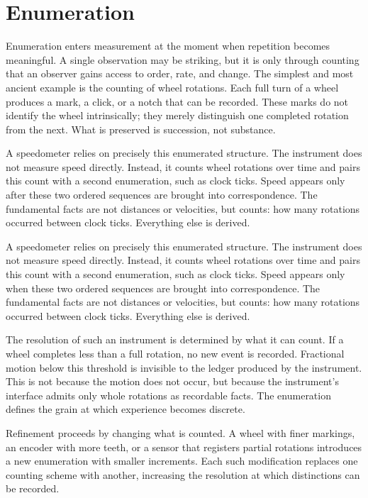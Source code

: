 \section{Enumeration}
\label{sec:enumeration}

Enumeration enters measurement at the moment when repetition becomes
meaningful. A single observation may be striking, but it is only through
counting that an observer gains access to order, rate, and change. The simplest
and most ancient example is the counting of wheel rotations. Each full turn of
a wheel produces a mark, a click, or a notch that can be recorded. These marks
do not identify the wheel intrinsically; they merely distinguish one completed
rotation from the next. What is preserved is succession, not substance.

A speedometer relies on precisely this enumerated structure. The instrument does
not measure speed directly. Instead, it counts wheel rotations over time and
pairs this count with a second enumeration, such as clock ticks. Speed appears
only after these two ordered sequences are brought into correspondence. The
fundamental facts are not distances or velocities, but counts: how many
rotations occurred between clock ticks. Everything else is derived.

A speedometer relies on precisely this enumerated structure.  The instrument does
not measure speed directly.  Instead, it counts wheel rotations over time and
pairs this count with a second enumeration, such as clock ticks.  Speed appears
only when these two ordered sequences are brought into correspondence.  The
fundamental facts are not distances or velocities, but counts: how many
rotations occurred between clock ticks.  Everything else is derived.

The resolution of such an instrument is determined by what it can count. If a
wheel completes less than a full rotation, no new event is recorded. Fractional
motion below this threshold is invisible to the ledger produced by the
instrument. This is not because the motion does not occur, but because the
instrument’s interface admits only whole rotations as recordable facts. The
enumeration defines the grain at which experience becomes discrete.

Refinement proceeds by changing what is counted. A wheel with finer markings, an
encoder with more teeth, or a sensor that registers partial rotations introduces
a new enumeration with smaller increments. Each such modification replaces one
counting scheme with another, increasing the resolution at which distinctions
can be recorded.

